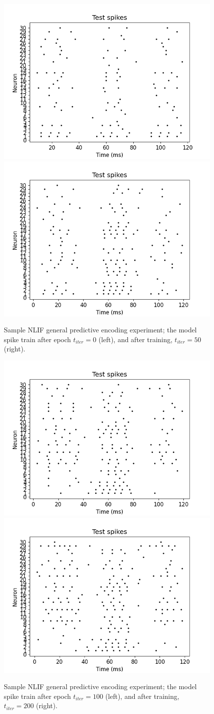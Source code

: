 \documentclass[mphil,deptreport,ianc]{infthesis} %
\begin{document}
\begin{figure}[!h]
    \centering
    \includegraphics[width=0.49\columnwidth]{figures/Supplementary/gating/NLIF/General/01-04_16-42-32-911/test_plot_spikes_train_iter_0_NLIF_23.png}
    \includegraphics[width=0.49\columnwidth]{figures/Supplementary/gating/NLIF/General/01-04_16-42-32-911/test_plot_spikes_train_iter_50_NLIF_23.png}
    \caption{Sample NLIF general predictive encoding experiment; the model spike train after epoch $t_{iter}=0$ (left), and after training, $t_{iter}=50$ (right).}
    \label{fig:NLIF_GPE_1_readouts_t_i_0_and_50}
\end{figure}

\begin{figure}[!h]
    \centering
    \includegraphics[width=0.49\columnwidth]{figures/Supplementary/gating/NLIF/General/01-04_16-42-32-911/test_plot_spikes_train_iter_100_NLIF_23.png}
    \includegraphics[width=0.49\columnwidth]{figures/Supplementary/gating/NLIF/General/01-04_16-42-32-911/test_plot_spikes_train_iter_199_NLIF_23.png}
    \caption{Sample NLIF general predictive encoding experiment; the model spike train after epoch $t_{iter}=100$ (left), and after training, $t_{iter}=200$ (right).}
    \label{fig:NLIF_GPE_1_readouts_t_i_100_and_200}
\end{figure}
\end{document}
